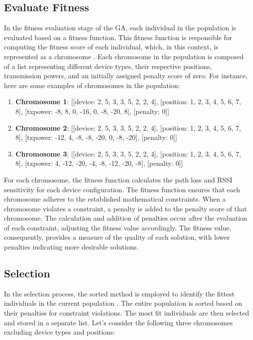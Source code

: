 \subsection{Evaluate Fitness}

In the fitness evaluation stage of the \gls{GA}, each individual in the population is evaluated based on a fitness function. This fitness function is responsible for computing the fitness score of each individual, which, in this context, is represented as a chromosome \cite{lambora2019genetic}. Each chromosome in the population is composed of a list representing different device types, their respective positions, transmission powers, and an initially assigned penalty score of zero. For instance, here are some examples of chromosomes in the population:

\begin{enumerate}
    \item \textbf{Chromosome 1}: [[device: 2, 5, 3, 3, 5, 2, 2, 4], [position: 1, 2, 3, 4, 5, 6, 7, 8], [txpower: -8, 8, 0, -16, 0, -8, -20, 8], [penalty: 0]]
    \item \textbf{Chromosome 2}: [[device: 2, 5, 3, 3, 5, 2, 2, 4], [position: 1, 2, 3, 4, 5, 6, 7, 8], [txpower: -12, 4, -8, -8, -20, 0, -8, -20], [penalty: 0]]
    \item \textbf{Chromosome 3}: [[device: 2, 5, 3, 3, 5, 2, 2, 4], [position: 1, 2, 3, 4, 5, 6, 7, 8], [txpower: 4, -12, -20, -4, -8, -12, -20, -8], [penalty: 0]]
\end{enumerate}

For each chromosome, the fitness function calculates the path loss and \gls{RSSI} sensitivity for each device configuration. The fitness function ensures that each chromosome adheres to the established mathematical constraints. When a chromosome violates a constraint, a penalty is added to the penalty score of that chromosome. The calculation and addition of penalties occur after the evaluation of each constraint, adjusting the fitness value accordingly. The fitness value, consequently, provides a measure of the quality of each solution, with lower penalties indicating more desirable solutions.

\subsection{Selection}

In the selection process, the sorted method is employed to identify the fittest individuals in the current population \cite{lambora2019genetic}. The entire population is sorted based on their penalties for constraint violations. The most fit individuals are then selected and stored in a separate list. Let's consider the following three chromosomes excluding device types and positions:

